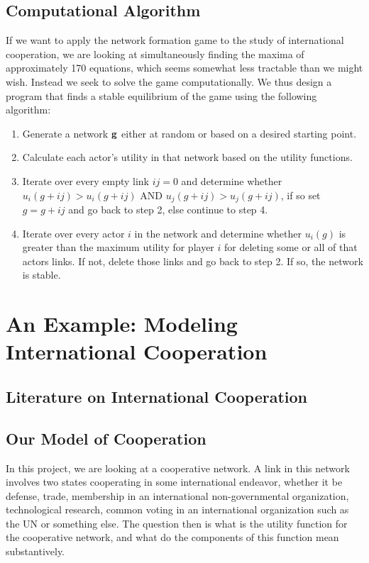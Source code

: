 \documentclass[12pt,onesided,fullpage]{amsart}
\begin{document}
\subsection{Computational Algorithm}
If we want to apply the network formation game to the study of international cooperation, we are looking at simultaneously finding the maxima of approximately 170 equations, which seems somewhat less tractable than we might wish. Instead we seek to solve the game computationally. We thus design a program that finds a stable equilibrium of the game using the following algorithm:
\begin{enumerate}
\item Generate a network $\bf{g}$ either at random or based on a desired starting point. 
\item Calculate each actor's utility in that network based on the utility functions.
\item Iterate over every empty link $ij = 0$ and determine whether \\ $u_{i}(g+ij) > u_{i}(g+ij)  \text{ AND } u_{j}(g+ij) > u_{j}(g+ij)$, if so set $g = g + ij$ and go back to step 2, else continue to step 4.
\item Iterate over every actor $i$ in the network and determine whether $u_{i}(g)$ is greater than the maximum utility for player $i$ for deleting some or all of that actors links. If not, delete those links and go back to step 2. If so, the network is stable.
\end{enumerate}

\section{An Example: Modeling International Cooperation}
\subsection{Literature on International Cooperation}
\subsection{Our Model of Cooperation}
In this project, we are looking at a cooperative network. A link in this network involves two states cooperating in some international endeavor, whether it be defense, trade, membership in an international non-governmental organization, technological research, common voting in an international organization such as the UN or something else. The question then is what is the utility function for the cooperative network, and what do the components of this function mean substantively.
\end{document}

